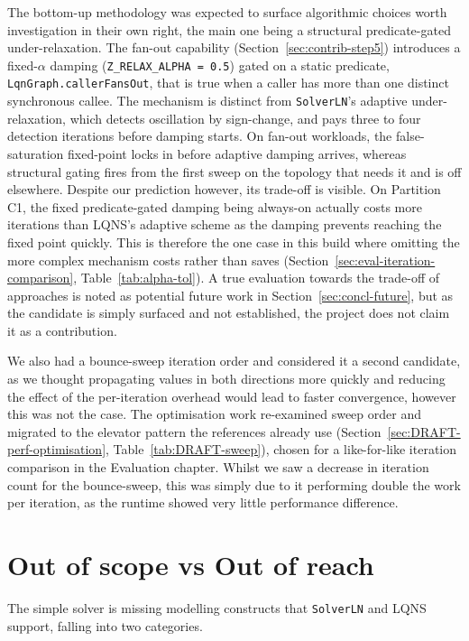 The bottom-up methodology was expected to surface algorithmic choices worth investigation in their own right, the main one being a structural predicate-gated under-relaxation. The fan-out capability (Section~\ref{sec:contrib-step5}) introduces a fixed-$\alpha$ damping (\texttt{Z\_RELAX\_ALPHA = 0.5}) gated on a static predicate, \texttt{LqnGraph.callerFansOut}, that is true when a caller has more than one distinct synchronous callee. The mechanism is distinct from \texttt{SolverLN}'s adaptive under-relaxation, which detects oscillation by sign-change, and pays three to four detection iterations before damping starts. On fan-out workloads, the false-saturation fixed-point locks in before adaptive damping arrives, whereas structural gating fires from the first sweep on the topology that needs it and is off elsewhere. Despite our prediction however, its trade-off is visible. On Partition C1, the fixed predicate-gated damping being always-on actually costs more iterations than LQNS's adaptive scheme as the damping prevents reaching the fixed point quickly. This is therefore the one case in this build where omitting the more complex mechanism costs rather than saves (Section~\ref{sec:eval-iteration-comparison}, Table~\ref{tab:alpha-tol}). A true evaluation towards the trade-off of approaches is noted as potential future work in Section~\ref{sec:concl-future}, but as the candidate is simply surfaced and not established, the project does not claim it as a contribution.

We also had a bounce-sweep iteration order and considered it a second candidate, as we thought propagating values in both directions more quickly and reducing the effect of the per-iteration overhead would lead to faster convergence, however this was not the case. The optimisation work re-examined sweep order and migrated to the elevator pattern the references already use (Section~\ref{sec:DRAFT-perf-optimisation}, Table~\ref{tab:DRAFT-sweep}), chosen for a like-for-like iteration comparison in the Evaluation chapter. Whilst we saw a decrease in iteration count for the bounce-sweep, this was simply due to it performing double the work per iteration, as the runtime showed very little performance difference.


\section{Out of scope vs Out of reach}
\label{sec:concl-scope}

The simple solver is missing modelling constructs that \texttt{SolverLN} and LQNS support, falling into two categories. 

